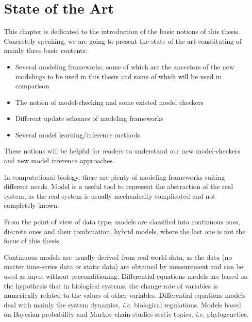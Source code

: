 \chapter{State of the Art}\label{chap:stateOfTheArt}

\begin{mybox}
This chapter is dedicated to the introduction of the basic notions of this thesis.
Concretely speaking, we are going to present the state of the art constituting of mainly three basic contents:

\begin{itemize}
    \item Several modeling frameworks, some of which are the ancestors of the new modelings to be used in this thesis and some of which will be used in comparison
    \item The notion of model-checking and some existed model checkers 
    \item Different update schemes of modeling frameworks
    \item Several model learning/inference methods
\end{itemize}

These notions will be helpful for readers to understand our new model-checkers and new model inference approaches.
\end{mybox}

In computational biology, there are plenty of modeling frameworks suiting different needs.
Model is a useful tool to represent the abstraction of the real system, as the real system is usually mechanically complicated and not completely known.

From the point of view of data type, models are classified into continuous ones, discrete ones and their combination, hybrid models, where the last one is not the focus of this thesis.

Continuous models are usually derived from real world data, as the data (no matter time-series data or static data) are obtained by measurement and can be used as input without preconditioning.
Differential equations models \cite{glass1973logical,snoussi1989qualitative,thomas1990biological} are based on the hypothesis that in biological systems, the change rate of variables is numerically related to the values of other variables. 
Differential equations models deal with mainly the system dynamics, \textit{i.e.} biological regulations.
Models based on Bayesian probability and Markov chain \cite{huelsenbeck2001mrbayes,larget1999markov} studies static topics, \textit{i.e.} phylogenetics.

